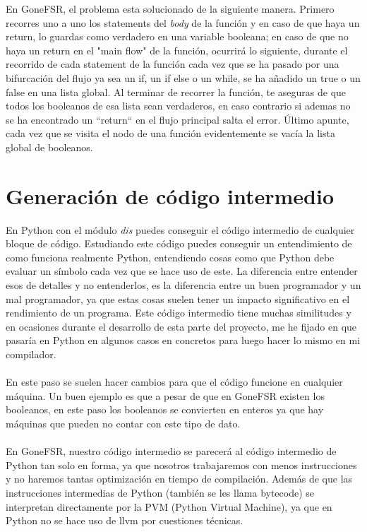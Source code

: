 En GoneFSR, el problema esta solucionado de la siguiente manera. Primero recorres uno a uno los statements del \textit{body} de la función y en caso de que haya un return, lo guardas como verdadero en una variable booleana; en caso de que no haya un return en el "main flow" de la función, ocurrirá lo siguiente, durante el recorrido de cada statement de la función cada vez que se ha pasado por una bifurcación del flujo ya sea un if, un if else o un while, se ha añadido un true o un false en una lista global. Al terminar de recorrer la función, te aseguras de que todos los booleanos de esa lista sean verdaderos, en caso contrario si ademas no se ha encontrado un ``return`` en el flujo principal salta el error. Último apunte, cada vez que se visita el nodo de una función evidentemente se vacía la lista global de booleanos.
\section{Generación de código intermedio}
En Python con el módulo \textit{dis} puedes conseguir el código intermedio de cualquier bloque de código. Estudiando este código puedes conseguir un entendimiento de como funciona realmente Python, entendiendo cosas como que Python debe evaluar un símbolo cada vez que se hace uso de este. La diferencia entre entender esos de detalles y no entenderlos, es la diferencia entre un buen programador y un mal programador, ya que estas cosas suelen tener un impacto significativo en el rendimiento de un programa. Este código intermedio tiene muchas similitudes y en ocasiones durante el desarrollo de esta parte del proyecto, me he fijado en que pasaría en Python en algunos casos en concretos para luego hacer lo mismo en mi compilador. \\\\
\noindent En este paso se suelen hacer cambios para que el código funcione en cualquier máquina. Un buen ejemplo es que a pesar de que en GoneFSR existen los booleanos, en este paso los booleanos se convierten en enteros ya que hay máquinas que pueden no contar con este tipo de dato. \\\\
En GoneFSR, nuestro código intermedio se parecerá al código intermedio de Python tan solo en forma, ya que nosotros trabajaremos con menos instrucciones y no haremos tantas optimización en tiempo de compilación. Además de que las instrucciones intermedias de Python (también se les llama bytecode) se interpretan directamente por la PVM (Python Virtual Machine), ya que en Python no se hace uso de llvm por cuestiones técnicas. \\\\
